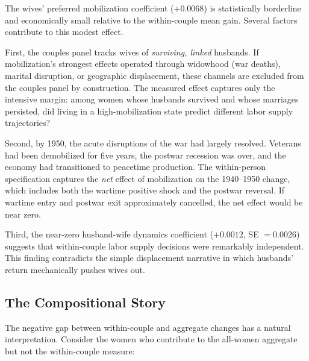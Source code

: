 \documentclass[12pt]{article}
\begin{document}
The wives' preferred mobilization coefficient ($+0.0068$) is statistically borderline and economically small relative to the within-couple mean gain. Several factors contribute to this modest effect.

First, the couples panel tracks wives of \textit{surviving, linked} husbands. If mobilization's strongest effects operated through widowhood (war deaths), marital disruption, or geographic displacement, these channels are excluded from the couples panel by construction. The measured effect captures only the intensive margin: among women whose husbands survived and whose marriages persisted, did living in a high-mobilization state predict different labor supply trajectories?

Second, by 1950, the acute disruptions of the war had largely resolved. Veterans had been demobilized for five years, the postwar recession was over, and the economy had transitioned to peacetime production. The within-person specification captures the \textit{net} effect of mobilization on the 1940--1950 change, which includes both the wartime positive shock and the postwar reversal. If wartime entry and postwar exit approximately cancelled, the net effect would be near zero.

Third, the near-zero husband-wife dynamics coefficient ($+0.0012$, SE $= 0.0026$) suggests that within-couple labor supply decisions were remarkably independent. This finding contradicts the simple displacement narrative in which husbands' return mechanically pushes wives out.

\subsection{The Compositional Story}

The negative gap between within-couple and aggregate changes has a natural interpretation. Consider the women who contribute to the all-women aggregate but not the within-couple measure:
\end{document}
